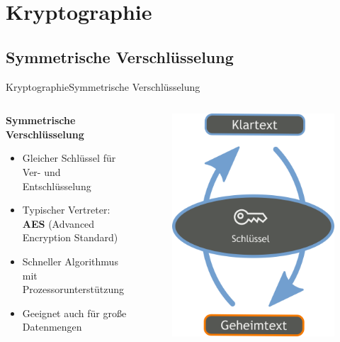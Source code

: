 \documentclass[10pt]{beamer}
\begin{document}
\section{Kryptographie}
\subsection{Symmetrische Verschlüsselung}
\begin{frame}{Kryptographie}{Symmetrische Verschlüsselung}
	\begin{columns}
		\begin{column}{6cm}
			\textbf{Symmetrische Verschlüsselung}
			\begin{itemize}
				\item Gleicher Schlüssel für Ver- und Entschlüsselung
				\item Typischer Vertreter: \textbf{AES} (Advanced Encryption Standard)
				\item Schneller Algorithmus mit Prozessorunterstützung
				\item Geeignet auch für große Datenmengen
			\end{itemize}
		\end{column}
		\begin{column}{5cm}
			\begin{figure}[p]
				\centering
				\includegraphics[scale=0.25]{SymKrypto.png}

\end{figure}
\end{column}
\end{columns}
\end{frame}
\end{document}
